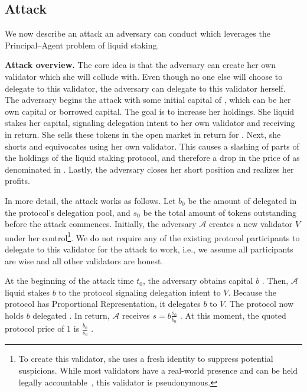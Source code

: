 \subsection{Attack}

We now describe an attack an adversary can conduct which leverages the
Principal--Agent problem of liquid staking.

\noindent
\textbf{Attack overview.}
The core idea is that the adversary can create her own validator
which she will collude with.
Even though no one else will choose to delegate to
this validator, the adversary can delegate to this validator herself.
The adversary begins the attack with some initial capital of \asset, which
can be her own capital or borrowed capital. The goal is to increase her
\asset holdings. She liquid stakes her capital, signaling delegation
intent to her own validator and receiving \stasset in return.
She sells these tokens in the open market in return for \asset.
Next, she shorts \stasset and equivocates using her own validator.
This causes a slashing of parts of the \asset holdings of the liquid
staking protocol, and therefore a drop in the price of \stasset
as denominated in \asset. Lastly, the adversary closes her short
position and realizes her profits.


In more detail, the attack works as follows.
Let $b_0$ be the amount of delegated \asset in the protocol's delegation pool,
and $s_0$ be the total amount of \stasset tokens outstanding
before the attack commences.
Initially,
the adversary $\mathcal{A}$ creates a new validator $V$
under her control\footnote{To create this validator, she uses a fresh identity
to suppress potential suspicions. While most validators
have a real-world presence and can be held legally
accountable~\cite{liquid-staking-report}, this validator is pseudonymous.}.
We do not require any of the existing protocol participants to delegate
to this validator for the attack to work, i.e., we assume all participants
are wise and all other validators are honest.

At the beginning of the attack time $t_0$, the adversary obtains capital
$b$ \asset. Then, $\mathcal{A}$
liquid stakes $b$ \asset to the protocol
signaling delegation intent to $V$. Because the
protocol has Proportional Representation, it delegates $b$ \asset to $V$.
The protocol now holds $b$ delegated \asset.
In return, $\mathcal{A}$ receives $s = b \frac{s_0}{b_0}$ \stasset.
At this moment, the quoted protocol price of $1$ \stasset is
$\frac{b_0}{s_0}$ \asset.

